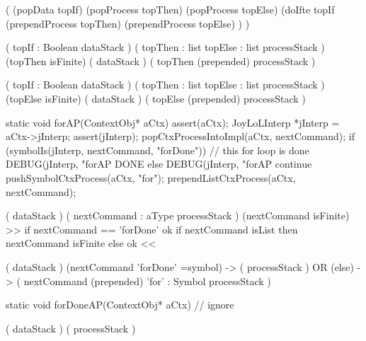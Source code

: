 \startImplementation[ansic]
  (
    (popData topIf)
    (popProcess topThen)
    (popProcess topElse)
    (doIfte topIf 
      (prependProcess topThen)
      (prependProcess topElse)
    )
  )
\stopImplementation

\preDataStack
  (
    topIf : Boolean
    dataStack
  )
\preProcessStack
  (
    topThen : list
    topElse : list
    processStack
  )
\preConditions
  (topThen isFinite)
\postDataStack
  (
    dataStack
  )
\postProcessStack
  (
    topThen (prepended)
    processStack
  )
\postConditions
\stopRule

\preDataStack
  (
    topIf : Boolean
    dataStack
  )
\preProcessStack
  (
    topThen : list
    topElse : list
    processStack
  )
\preConditions
  (topElse isFinite)
\postDataStack
  (
    dataStack
  )
\postProcessStack
  (
    topElse (prepended)
    processStack
  )
\postConditions
\stopRule

\stopJoyLoLWord

\startCCode
static void forAP(ContextObj* aCtx) {
  assert(aCtx);
  JoyLoLInterp *jInterp = aCtx->jInterp;
  assert(jInterp);
  popCtxProcessIntoImpl(aCtx, nextCommand);
  if (symbolIs(jInterp, nextCommand, "forDone")) {
    // this for loop is done
    DEBUG(jInterp, "forAP DONE%
  } else {
    DEBUG(jInterp, "forAP continue%
    pushSymbolCtxProcess(aCtx, "for");
    prependListCtxProcess(aCtx, nextCommand);
  }
}
\stopCCode

\starttyping

\startWord[for]
\preDataStack
  (
    dataStack
  )
\preProcessStack
  (
    nextCommand : aType
    processStack
  )
\preConditions
  (nextCommand isFinite)  >> if nextCommand == 'forDone' ok
                             if nextCommand isList then nextCommand isFinite
                             else ok <<
\stopPreStack

\postDataStack
  (
    dataStack
  )
\postProcessStack
  (nextCommand 'forDone' =symbol) -> (
    processStack
  )
  OR
  (else) -> (
    nextCommand (prepended)
    'for' : Symbol
    processStack
  )
\postConditions
\stopPostStack

\stopWord

\stoptyping

\startCCode
static void forDoneAP(ContextObj* aCtx) {
  // ignore
}
\stopCCode

\starttyping

\startWord[forDone]

\preDataStack
  ( dataStack )
\preProcessStack
  ( processStack )
\preConditions
\stopPreStack

